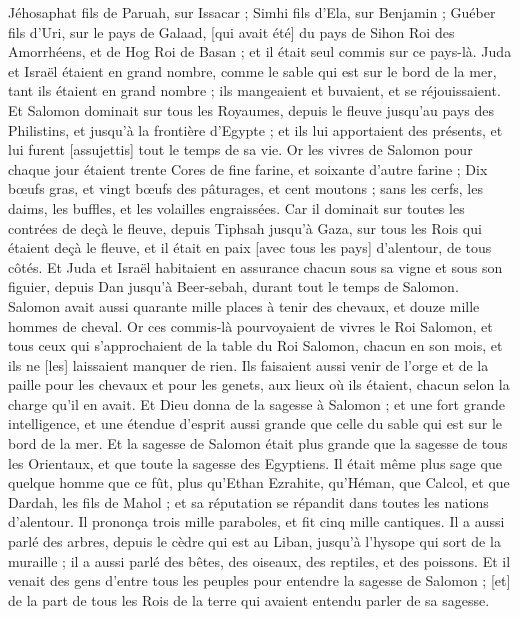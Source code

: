 \begin{multicols}{2}
Jéhosaphat fils de Paruah, sur Issacar ;
Simhi fils d'Ela, sur Benjamin ;
Guéber fils d'Uri, sur le pays de Galaad, [qui avait été] du pays de Sihon Roi des Amorrhéens, et de Hog Roi de Basan ; et il était seul commis sur ce pays-là.
Juda et Israël étaient en grand nombre, comme le sable qui est sur le bord de la mer, tant ils étaient en grand nombre ; ils mangeaient et buvaient, et se réjouissaient.
Et Salomon dominait sur tous les Royaumes, depuis le fleuve jusqu'au pays des Philistins, et jusqu'à la frontière d'Egypte ; et ils lui apportaient des présents, et lui furent [assujettis] tout le temps de sa vie.
Or les vivres de Salomon pour chaque jour étaient trente Cores de fine farine, et soixante d'autre farine ;
Dix bœufs gras, et vingt bœufs des pâturages, et cent moutons ; sans les cerfs, les daims, les buffles, et les volailles engraissées.
Car il dominait sur toutes les contrées de deçà le fleuve, depuis Tiphsah jusqu'à Gaza, sur tous les Rois qui étaient deçà le fleuve, et il était en paix [avec tous les pays] d'alentour, de tous côtés.
Et Juda et Israël habitaient en assurance chacun sous sa vigne et sous son figuier, depuis Dan jusqu'à Beer-sebah, durant tout le temps de Salomon.
Salomon avait aussi quarante mille places à tenir des chevaux, et douze mille hommes de cheval.
Or ces commis-là pourvoyaient de vivres le Roi Salomon, et tous ceux qui s'approchaient de la table du Roi Salomon, chacun en son mois, et ils ne [les] laissaient manquer de rien.
Ils faisaient aussi venir de l'orge et de la paille pour les chevaux et pour les genets, aux lieux où ils étaient, chacun selon la charge qu'il en avait.
Et Dieu donna de la sagesse à Salomon ; et une fort grande intelligence, et une étendue d'esprit aussi grande que celle du sable qui est sur le bord de la mer.
Et la sagesse de Salomon était plus grande que la sagesse de tous les Orientaux, et que toute la sagesse des Egyptiens.
Il était même plus sage que quelque homme que ce fût, plus qu'Ethan Ezrahite, qu'Héman, que Calcol, et que Dardah, les fils de Mahol ; et sa réputation se répandit dans toutes les nations d'alentour.
Il prononça trois mille paraboles, et fit cinq mille cantiques.
Il a aussi parlé des arbres, depuis le cèdre qui est au Liban, jusqu'à l'hysope qui sort de la muraille ; il a aussi parlé des bêtes, des oiseaux, des reptiles, et des poissons.
Et il venait des gens d'entre tous les peuples pour entendre la sagesse de Salomon ; [et] de la part de tous les Rois de la terre qui avaient entendu parler de sa sagesse.

\end{multicols}

